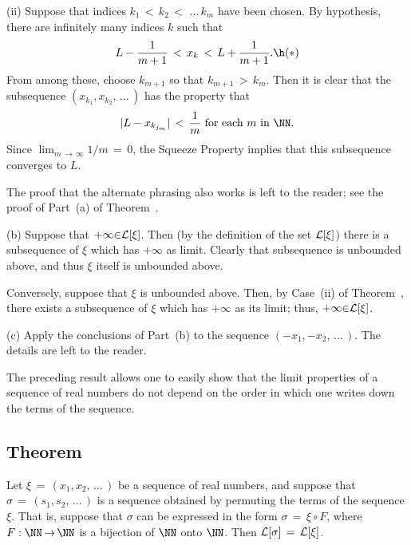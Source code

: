 {        (ii) Suppose that indices $k_{1}\,<\,k_{2}\,<\,\,{\ldots}\,k_{m}$ have been chosen. By hypothesis, there are infinitely many indices $k$ such that
        \begin{displaymath}
        L-\frac{1}{m+1}\,<\,x_{k}\,<\,L+\frac{1}{m+1}. \h ({\ast})
        \end{displaymath}
    From among these, choose $k_{m+1}$ so that $k_{m+1}\,>\,k_{m}$.
    Then it is clear that the subsequence $(x_{k_{1}},x_{k_{2}},\,{\ldots}\,)$ has the property that
        \begin{displaymath}
        |L-x_{k_{j_{m}}}|\,<\,\frac{1}{m} \mbox{ for each $m$ in ${\NN}$}.
        \end{displaymath}
    Since $\lim_{m \,{\rightarrow}\, {\infty}} 1/m \,=\, 0$, the Squeeze Property implies that this subsequence converges to $L$.

        The proof that the alternate phrasing also works is left to the reader;
    see the proof of Part~(a) of Theorem~.

\V

         (b) Suppose that $+{\infty}{\in}{\cal L}[{\xi}]$.
 Then (by the definition of  the set ${\cal L}[{\xi}]$) there is a subsequence of ${\xi}$ which has $+{\infty}$ as limit.
    Clearly that subsequence is unbounded above, and thus ${\xi}$ itself is unbounded above.

        Conversely, suppose that ${\xi}$ is unbounded above.
    Then, by Case~(ii) of Theorem~, there exists a subsequence of ${\xi}$ which has $+{\infty}$ as its limit; thus, $+{\infty}{\in}{\cal L}[{\xi}]$.

\V

        (c) Apply the conclusions of Part~(b) to the sequence $(-x_{1},-x_{2},\,{\ldots}\,)$.
    The details are left to the reader.

\V
\V

        The preceding result allows one to easily show that the limit properties of a sequence of real numbers do not depend on the order in which one writes down the terms of the sequence.

\V
\V

            \subsection{\small{\bf Theorem}}
            \label{ThmC50.110}

        Let ${\xi} \,=\, (x_{1},x_{2},\,{\ldots}\,)$ be a sequence of real numbers,
    and suppose that ${\sigma} \,=\, (s_{1},s_{2},\,{\ldots}\,)$ is a sequence obtained by permuting the terms of the sequence ${\xi}$.
    That is, suppose that ${\sigma}$ can be expressed in the form ${\sigma} \,=\, {\xi}{\circ}F$, where $F:{\NN} \,{\rightarrow}\, {\NN}$ is a bijection of ${\NN}$ onto ${\NN}$.
    Then ${\cal L}[{\sigma}] \,=\, {\cal L}[{\xi}]$.

}
